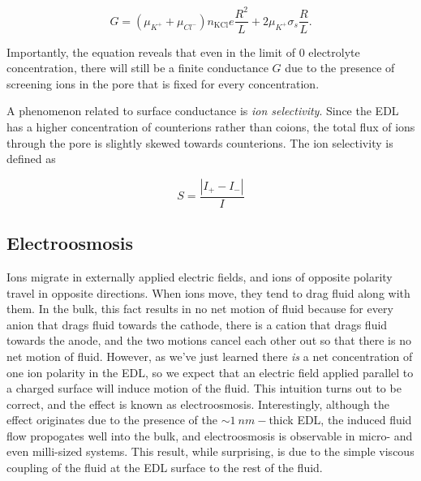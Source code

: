 			\[ G=\left(\mu_{K^{+}}+\mu_{Cl^{-}}\right)n_{\textrm{KCl}}e\frac{R^{2}}{L}+2\mu_{K^{+}}\sigma_{s}\frac{R}{L}. \]
			
			Importantly, the equation reveals that even in the limit of 0 electrolyte concentration, there will still be a finite conductance $G$ due to the presence of screening ions in the pore that is fixed for every concentration.
			
			A phenomenon related to surface conductance is \textit{ion selectivity}. Since the EDL has a higher concentration of counterions rather than coions, the total flux of ions through the pore is slightly skewed towards counterions. The ion selectivity is defined as
			
			\begin{equation} \label{eq:selectivity}
				S=\frac{|I_{+}-I_{-}|}{I}
			\end{equation}


			
			
		
			
			
		\subsection{Electroosmosis}
			
			Ions migrate in externally applied electric fields, and ions of opposite polarity travel in opposite directions. When ions move, they tend to drag fluid along with them. In the bulk, this fact results in no net motion of fluid because for every anion that drags fluid towards the cathode, there is a cation that drags fluid towards the anode, and the two motions cancel each other out so that there is no net motion of fluid. However, as we've just learned there \textit{is} a net concentration of one ion polarity in the EDL, so we expect that an electric field applied parallel to a charged surface will induce motion of the fluid. This intuition turns out to be correct, and the effect is known as electroosmosis. Interestingly, although the effect originates due to the presence of the $\sim \SI{1}{nm}-$thick EDL, the induced fluid flow propogates well into the bulk, and electroosmosis is observable in micro- and even milli-sized systems. This result, while surprising, is due to the simple viscous coupling of the fluid at the EDL surface to the rest of the fluid.
			
